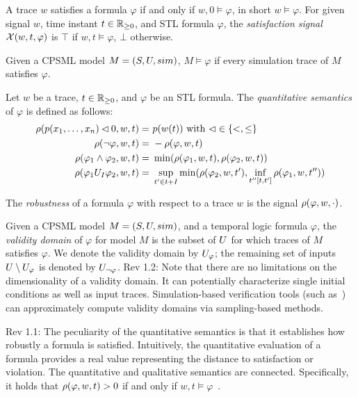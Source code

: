 A trace $w$ satisfies a formula $\varphi$ if and only if $w,0 \models \varphi$, in short $w \models \varphi$.
For given signal $w$, time instant $t\in\mathbb{R}_{\geq 0}$, and STL formula $\varphi$, the \emph{satisfaction
signal} $\mathcal{X}(w,t,\varphi)$ is $\top$ if $w,t \models \varphi$,  $\bot$ otherwise.

Given a CPSML model $M = (S, U, sim)$, $M \models \varphi$ if
every simulation trace of $M$ satisfies $\varphi$.

\begin{definition}
	Let $w$ be a trace, $t \in \mathbb{R}_{\geq 0}$, and $\varphi$ be an STL formula.
	The \emph{quantitative semantics} of $\varphi$ is defined as follows:
	\begin{equation}
		\begin{split}
			\rho(p(x_1, \dots, x_n) \lhd 0,w,t) = &\ p(w(t)) \text{ with } \lhd \in \{<,\leq \} \\
			\rho(\neg\varphi,w,t) = &\ -\rho(\varphi,w,t) \\
			\rho(\varphi_1 \wedge \varphi_2,w,t) = &\ \min( \rho(\varphi_1,w,t), \rho(\varphi_2,w,t) ) \\
			\rho(\varphi_1 U_{I} \varphi_2,w,t) = &\ \sup_{t' \in t+I} \min( \rho(\varphi_2,w,t'), \inf_{t''[t,t']} \rho(\varphi_1,w,t'') ) \\
		\end{split}
	\end{equation}
\end{definition}
The \emph{robustness} of a formula $\varphi$ with respect to a trace $w$ is the signal $\rho(\varphi,w,\cdot)$.

Given a CPSML model $M = (S, U, sim)$, 
and a temporal logic formula $\varphi$,
the \emph{validity domain} of $\varphi$ for model $M$ is the subset of
$U$ for which traces of $M$ satisfies $\varphi$.
We denote the validity domain by $U_{\varphi}$; the remaining
set of inputs $U \setminus U_{\varphi}$ is denoted by
$U_{\neg\varphi}$.
{\color{blue} Rev 1.2: Note that there are no limitations on the dimensionality of a validity domain. It can potentially characterize
single initial conditions as well as input traces.}
Simulation-based verification tools (such as~\cite{donze2010breach})
can approximately compute validity domains via sampling-based methods.

{\color{blue} Rev 1.1: The peculiarity of the quantitative semantics is that it establishes how robustly a formula is satisfied.
Intuitively, the quantitative evaluation of a formula provides a real value representing
the distance to satisfaction or violation.
The  quantitative  and  qualitative  semantics  are  connected. Specifically, it holds that 
$\rho(\varphi,w,t) > 0$ if and only if $w,t \models \varphi$~\cite{donze2013efficient}.}


